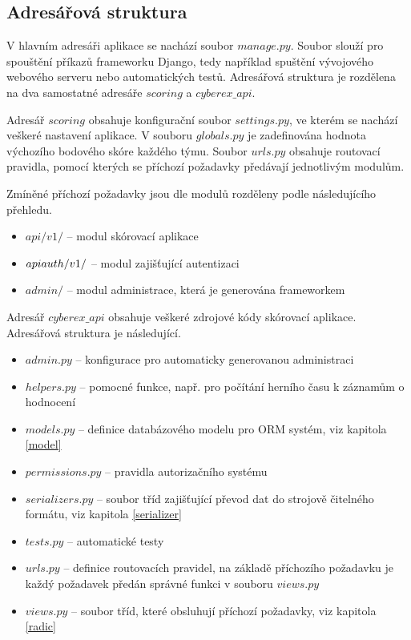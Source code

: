 \documentclass[
  digital,
  twoside,
  table, 
  nolof, 
  nolot
]{fithesis3}
\begin{document}
\subsection{Adresářová struktura}
V hlavním adresáři aplikace se nachází soubor $manage.py$. Soubor slouží pro spouštění příkazů frameworku Django, tedy například spuštění vývojového webového serveru nebo automatických testů. Adresářová struktura je rozdělena na dva samostatné adresáře $scoring$ a $cyberex\_api$.

Adresář $scoring$ obsahuje konfigurační soubor $settings.py$, ve kterém se nachází veškeré nastavení aplikace. V souboru $globals.py$ je zadefinována hodnota výchozího bodového skóre každého týmu. Soubor $urls.py$ obsahuje routovací pravidla, pomocí kterých se příchozí požadavky předávají jednotlivým modulům.

Zmíněné příchozí požadavky jsou dle modulů rozděleny podle následujícího přehledu.

\begin{itemize}
    \item $api/v1/$ -- modul skórovací aplikace
    \item $api\-auth/v1/$ -- modul zajišťující autentizaci
    \item $admin/$ -- modul administrace, která je generována frameworkem
\end{itemize}

Adresář $cyberex\_api$ obsahuje veškeré zdrojové kódy skórovací aplikace. Adresářová struktura je následující.

\begin{itemize}
    \item $admin.py$ -- konfigurace pro automaticky generovanou administraci
    \item $helpers.py$ -- pomocné funkce, např. pro počítání herního času k záznamům o hodnocení
    \item $models.py$ -- definice databázového modelu pro ORM systém, viz kapitola \ref{model}
    \item $permissions.py$ -- pravidla autorizačního systému
    \item $serializers.py$ -- soubor tříd zajišťující převod dat do strojově čitelného formátu, viz kapitola \ref{serializer}
    \item $tests.py$ -- automatické testy
    \item $urls.py$ -- definice routovacích pravidel, na základě příchozího požadavku je každý požadavek předán správné funkci v souboru $views.py$
    \item $views.py$ -- soubor tříd, které obsluhují příchozí požadavky, viz kapitola \ref{radic}
\end{itemize}
\end{document}
